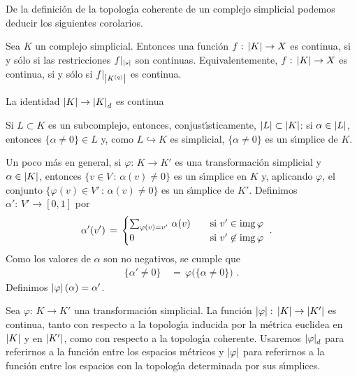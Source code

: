 De la definici\'{o}n de la topolog\'{\i}a coherente de un complejo
simplicial podemos deducir los siguientes corolarios.

\begin{coroTopologiaCoherenteComplejos}\label{thm:topologiacoherentecomplejos}
	Sea $K$ un complejo simplicial. Entonces una funci\'{o}n
	$f:\,\geom{K}\rightarrow X$ es continua, si y s\'{o}lo si las
	restricciones $f|_{\geom{s}}$ son continuas. Equivalentemente,
	$f:\,\geom{K}\rightarrow X$ es continua, si y s\'{o}lo si
	$f|_{\geom{\qesq{q}{K}}}$ es continua.
\end{coroTopologiaCoherenteComplejos}

\begin{coroTopologiaCoherenteIdentidad}\label{thm:topologiacoherenteidentidad}
	La identidad $\geom{K}\rightarrow\geom{K}_{d}$ es continua
\end{coroTopologiaCoherenteIdentidad}

Si $L\subset K$ es un subcomplejo, entonces, conjust\'{\i}sticamente,
$\geom{L}\subset\geom{K}$: si $\alpha\in\geom{L}$, entonces
$\{\alpha\not=0\}\in L$ y, como $L\hookrightarrow K$ es simplicial,
$\{\alpha\not=0\}$ es un s\'{\i}mplice de $K$.

\begin{obsRealizacionMorfismos}\label{obs:realizacionmorfismos}
	Un poco m\'{a}s en general, si $\varphi:\,K\rightarrow K'$ es una
	transformaci\'{o}n simplicial y $\alpha\in\geom{K}$, entonces
	$\{v\in V\,:\,\alpha(v)\not =0\}$ es un s\'{\i}mplice en $K$ y,
	aplicando $\varphi$, el conjunto
	$\{\varphi(v)\in V'\,:\,\alpha(v)\not =0\}$ es un s\'{\i}mplice de
	$K'$. Definimos $\alpha':\,V'\rightarrow[0,1]$ por
	\begin{align*}
		\alpha'(v') & \,=\,
			\begin{cases}
				\sum_{\varphi(v)=v'}\,\alpha(v) &
					\quad\text{si } v'\in\img\,\varphi \\
				0 & \quad\text{si } v'\not\in\img\,\varphi
			\end{cases}
		\text{ .}
	\end{align*}
	Como los valores de $\alpha$ son no negativos, se cumple que
	\begin{align*}
		\{\alpha'\not =0\} & \,=\,\varphi\big(\{\alpha\not =0\}\big)
		\text{ .}
	\end{align*}
	Definimos $\geom{\varphi}(\alpha)=\alpha'$.
\end{obsRealizacionMorfismos}

\begin{propoRealizacionMorfismos}\label{thm:realizacionmorfismos}
	Sea $\varphi:\,K\rightarrow K'$ una transformaci\'{o}n simplicial.
	La funci\'{o}n $\geom{\varphi}:\,\geom{K}\rightarrow\geom{K'}$ es
	continua, tanto con respecto a la topolog\'{\i}a inducida por la
	m\'{e}trica euclidea en $\geom{K}$ y en $\geom{K'}$, como con
	respecto a la topolog\'{\i}a coherente. Usaremos $\geom{\varphi}_{d}$
	para referirnos a la funci\'{o}n entre los espacios m\'{e}tricos y
	$\geom{\varphi}$ para referirnos a la funci\'{o}n entre los
	espacios con la topolog\'{\i}a determinada por sus s\'{\i}mplices.
\end{propoRealizacionMorfismos}

